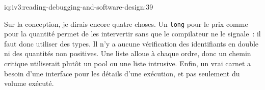 \begin{solution}{iq:iv3:reading-debugging-and-software-design:39}
\enlargethispage{-3\baselineskip}%
\label{lst:iv3:rd:bookfixed}

Sur la conception, je dirais encore quatre choses. Un \texttt{long} pour le prix comme pour la quantité permet de les intervertir sans que le compilateur ne le signale~: il faut donc utiliser des types. Il n'y a aucune vérification des identifiants en double ni des quantités non positives. Une liste alloue à chaque ordre, donc un chemin critique utiliserait plutôt un pool ou une liste intrusive. Enfin, un vrai carnet a besoin d'une interface pour les détails d'une exécution, et pas seulement du volume exécuté.


\end{solution}

